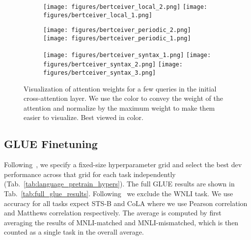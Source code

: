 \documentclass{article} \usepackage{iclr2022_conference,times}
\begin{document}
\begin{figure}[t]
    \centering
    \begin{subfigure}[b]{1.\textwidth}
        \texttt{[image: figures/bertceiver\_local\_2.png]}
        \texttt{[image: figures/bertceiver\_local\_1.png]}
    \end{subfigure}
    \begin{subfigure}[b]{1.\textwidth}
        \texttt{[image: figures/bertceiver\_periodic\_2.png]}
        \texttt{[image: figures/bertceiver\_periodic\_1.png]}
    \end{subfigure}
    \begin{subfigure}[b]{1.\textwidth}
        \texttt{[image: figures/bertceiver\_syntax\_1.png]}
        \texttt{[image: figures/bertceiver\_syntax\_2.png]}
        \texttt{[image: figures/bertceiver\_syntax\_3.png]}
    \end{subfigure}
    \caption{Visualization of attention weights for a few queries in the initial cross-attention layer. We use the color to convey the weight of the attention and normalize by the maximum weight to make them easier to visualize. Best viewed in color.}
    \label{fig:bert_vis}
    \vspace{-8pt}
\end{figure}

\subsection{GLUE Finetuning}
\label{sec:glue_finetuning_appendix}
Following~\cite{devlin2019bert}, we specify a fixed-size hyperparameter grid and select the best dev performance across that grid for each task independently (Tab.~\ref{tab:language_pretrain_hypers}). The full GLUE results are shown in Tab.~\ref{tab:full_glue_results}. Following~\cite{devlin2019bert} we exclude the WNLI task. We use accuracy for all tasks expect STS-B and CoLA where we use Pearson correlation and Matthews correlation respectively. The average is computed by first averaging the results of MNLI-matched and MNLI-mismatched, which is then counted as a single task in the overall average.
\end{document}
